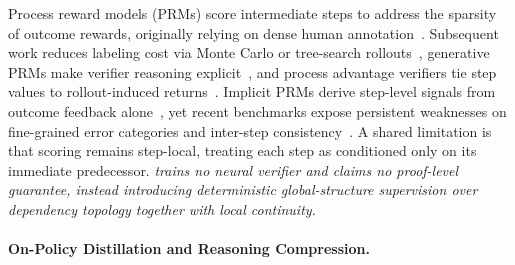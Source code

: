 Process reward models (PRMs) score intermediate steps to address the sparsity of outcome rewards, originally relying on dense human annotation~\citep{uesato2022solving,lightman2023lets}. Subsequent work reduces labeling cost via Monte Carlo or tree-search rollouts~\citep{wang2024math,luo2024omegaprm,zhang2024rest,lu2024autopsv,zhang2025qwen25mathprm}, generative PRMs make verifier reasoning explicit~\citep{thinkprm2025,genprm2026,she2025rprm}, and process advantage verifiers tie step values to rollout-induced returns~\citep{setlur2025rewarding,lai2024step}. Implicit PRMs derive step-level signals from outcome feedback alone~\citep{yuan2024implicitprm}, yet recent benchmarks expose persistent weaknesses on fine-grained error categories and inter-step consistency~\citep{song2025prmbench,zheng2025processbench}. A shared limitation is that scoring remains step-local, treating each step as conditioned only on its immediate predecessor. \textit{\method trains no neural verifier and claims no proof-level guarantee, instead introducing deterministic global-structure supervision over dependency topology together with local continuity.}


\paragraph{On-Policy Distillation and Reasoning Compression.}

